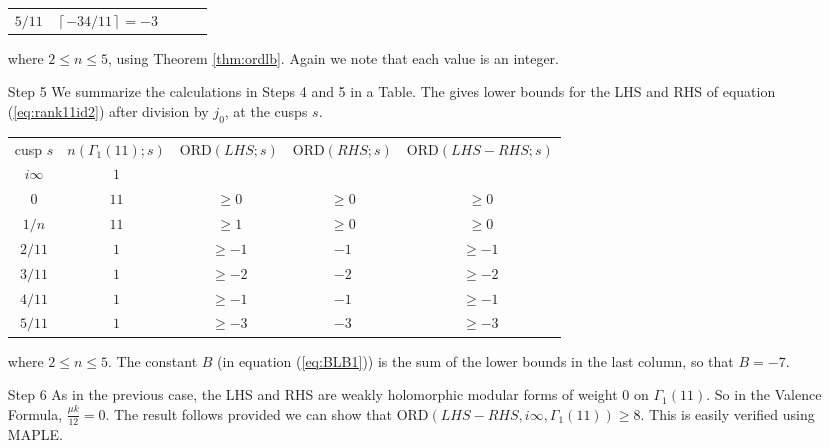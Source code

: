 \documentclass[12pt]{amsart}
\theoremstyle{definition}
\theoremstyle{remark}
\numberwithin{equation}{section}
\newcommand\CL[1]{\left\lceil#1\right\rceil}
\newcommand\ORD{\mbox{ORD}}
\newcommand\thm[1]{\ref{thm:#1}}
\newcommand\eqn[1]{(\ref{eq:#1})}
\begin{document}
\begin{enumerate}
\begin{center}
\begin{tabular}{c c c c c}
$5/11$       &   $\CL{-34/11}=-3$  \\
\end{tabular} 
\end{center} 
where $2\le n\le 5$, using Theorem \thm{ordlb}. 
Again we note that each value is an integer.
\item[Step 5] 
We summarize the calculations in Steps 4 and 5 in a Table.
The gives lower bounds for the LHS and RHS of equation \eqn{rank11id2}
after division by $j_0$,
at the cusps $s$.
\begin{center}
\begin{tabular}{c c c c c}
cusp $s$ & $n(\Gamma_1(11);s)$ & $\ORD(LHS;s)$ & $\ORD(RHS;s)$ 
& $\ORD(LHS-RHS;s)$ \\
$i\infty$    & $1$  &            &          &            \\
$0$          & $11$ &  $\ge0$    &  $\ge0$  &   $\ge 0$  \\
$1/n$        & $11$ &  $\ge1$ &   $\ge0$  &   $\ge 0$  \\
$2/11$       & $1$  &  $\ge-1$   &  $-1$    &   $\ge -1$ \\ 
$3/11$       & $1$  &  $\ge-2$   &  $-2$    &   $\ge -2$ \\ 
$4/11$       & $1$  &  $\ge-1$   &  $-1$    &   $\ge -1$  \\ 
$5/11$       & $1$  &  $\ge-3$   &  $-3$    &   $\ge -3$ \\ 
\end{tabular} 
\end{center} 
where $2\le n\le 5$. The constant $B$ (in equation \eqn{BLB1}) is
the sum of the lower bounds in the last column, so that $B=-7$.
\item[Step 6] As in the previous case, the LHS and RHS are weakly holomorphic 
modular 
forms of weight $0$ on $\Gamma_1(11)$. 
So in the Valence Formula, $\frac{\mu k}{12} = 0$. 
The result follows provided we can show that 
$\ORD(LHS-RHS,i\infty,\Gamma_1(11))\geq 8$. 
This is easily verified using MAPLE.
\end{enumerate}

\end{document}
